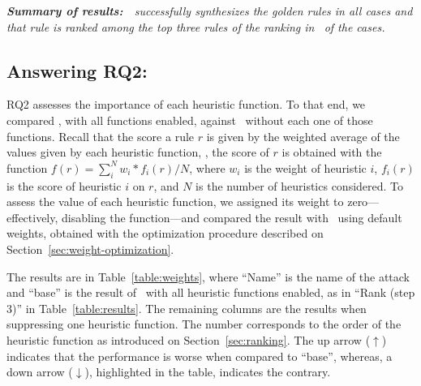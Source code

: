 \documentclass[conference]{IEEEtran}
\begin{document}
\emph{ \textbf{Summary of results:}~\tname\ successfully synthesizes
  the golden rules in all cases and that rule is ranked among the top
  three rules of the ranking in \percTopThreeRanking\ of the cases.  }


\subsection{Answering RQ2: \textRQtwo}
\label{sec:answer-rqtwo}

RQ2 assesses the importance of each heuristic function. To that end,
we compared \tname{}, with all functions enabled, against
\tname\ without each one of those functions. Recall that the score a
rule $r$ is given by the weighted average of the values given by each
heuristic function, \ie{}, the score of $r$ is obtained with the
function $f(r)=\sum_{i}^{N} w_i*f_i(r)/N$, where $w_i$ is the weight
of heuristic $i$, $f_i(r)$ is the score of heuristic $i$ on $r$, and
$N$ is the number of heuristics considered. To assess the value of
each heuristic function, we assigned its weight to zero---effectively,
disabling the function---and compared the result with \tname\ using
default weights, obtained with the optimization procedure described on
Section~\ref{sec:weight-optimization}.

The results are in Table~\ref{table:weights}, where ``Name'' is the
name of the attack and ``base'' is the result of
\tname\ with all heuristic functions enabled, as in ``Rank
(step 3)'' in Table~\ref{table:results}. The remaining columns are the
results when suppressing one heuristic
function. The number corresponds to the order of the heuristic function
as introduced on Section~\ref{sec:ranking}. The up arrow
($\uparrow$) indicates that the performance is worse when compared to ``base'',
whereas, a down arrow ($\downarrow$), 
highlighted in the table, indicates the contrary.
\end{document}
